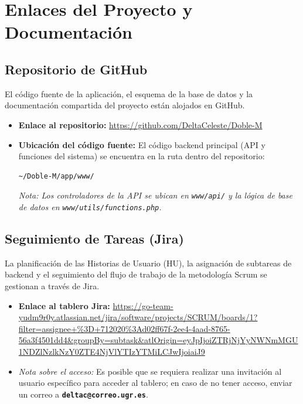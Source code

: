 \section{Enlaces del Proyecto y Documentación}

\subsection{Repositorio de GitHub}
El código fuente de la aplicación, el esquema de la base de datos y la documentación compartida del proyecto están alojados en GitHub.

\begin{itemize}
    \item \textbf{Enlace al repositorio:} \url{https://github.com/DeltaCeleste/Doble-M}
    \item \textbf{Ubicación del código fuente:} El código backend principal (API y funciones del sistema) se encuentra en la ruta dentro del repositorio:
    \begin{verbatim}
~/Doble-M/app/www/
    \end{verbatim}
    \textit{Nota: Los controladores de la API se ubican en \texttt{www/api/} y la lógica de base de datos en \texttt{www/utils/functions.php}.}
\end{itemize}

\subsection{Seguimiento de Tareas (Jira)}
La planificación de las Historias de Usuario (HU), la asignación de subtareas de backend y el seguimiento del flujo de trabajo de la metodología Scrum se gestionan a través de Jira.

\begin{itemize}
    \item \textbf{Enlace al tablero Jira:} \url{https://go-team-yudm9r0y.atlassian.net/jira/software/projects/SCRUM/boards/1?filter=assignee+\%3D+712020\%3Ad02ff67f-2ee4-4aad-8765-56a3f4501dd4&groupBy=subtask&atlOrigin=eyJpIjoiZTRjNjYyNWNmMGU1NDZlNzlkNzY0ZTE4NjVlYTIzYTMiLCJwIjoiaiJ9}
    \item \textit{Nota sobre el acceso:} Es posible que se requiera realizar una invitación al usuario específico para acceder al tablero; en caso de no tener acceso, enviar un correo a \textbf{\texttt{deltac@correo.ugr.es}}.
\end{itemize}